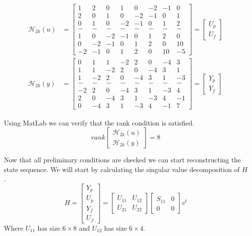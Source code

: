 \begin{align*}
	\mathcal{H}_{2k}(u) &= \begin{bmatrix}
		1  &   2  &   0  &   1  &   0  &  -2  &  -1  &   0\\
		2  &   0  &   1  &   0  &  -2  &  -1  &   0  &   1\\
		0  &   1  &   0  &  -2  &  -1  &   0  &   1  &   2\\ 
		- & - & - & - & - & - & - & -\\
		1  &   0  &  -2  &  -1  &   0  &   1  &   2  &   0\\
		0  &  -2  &  -1  &   0  &   1  &   2  &   0  &  10\\
		-2 &  -1  &   0  &   1  &   2  &   0  &  10  &  -5
	\end{bmatrix} = \begin{bmatrix} U_p \\ U_f \end{bmatrix} \\
	\mathcal{H}_{2k}(y) &= \begin{bmatrix}
		0  &   1  &   1  &  -2  &   2  &   0  &  -4  &   3\\
		1  &   1  &  -2  &   2  &   0  &  -4  &   3  &   1\\
		1  &  -2  &   2  &   0  &  -4  &   3  &   1  &  -3\\ 
		- & - & - & - & - & - & - & -\\
		-2 &   2  &   0  &  -4  &   3  &   1  &  -3  &   4\\
		2  &   0  &  -4  &   3  &   1  &  -3  &   4  &  -1\\
		0  &  -4  &   3  &   1  &  -3  &   4  &  -1  &   7
	\end{bmatrix} = \begin{bmatrix} Y_p \\ Y_f \end{bmatrix}
\end{align*}

Using MatLab we can verify that the rank condition is satisfied.
\[ rank\begin{bmatrix} \mathcal{H}_{2k}(u) \\ \mathcal{H}_{2k}(y) \end{bmatrix} = 8 \]

Now that all preliminary conditions are checked we can start reconstructing the state sequence. We will start by calculating the singular value decomposition of $H$.
\begin{equation*}
	H = \begin{bmatrix} Y_p\\U_p\\Y_f\\U_f \end{bmatrix} = \begin{bmatrix} U_{11} & U_{12} \\ U_{21} & U_{22} \end{bmatrix} \begin{bmatrix} S_{11} & 0 \\ 0 & 0 \end{bmatrix} v^t 
\end{equation*}
Where $U_{11}$ has size $6 \times 8$ and $U_{12}$ has size $6 \times 4$.

